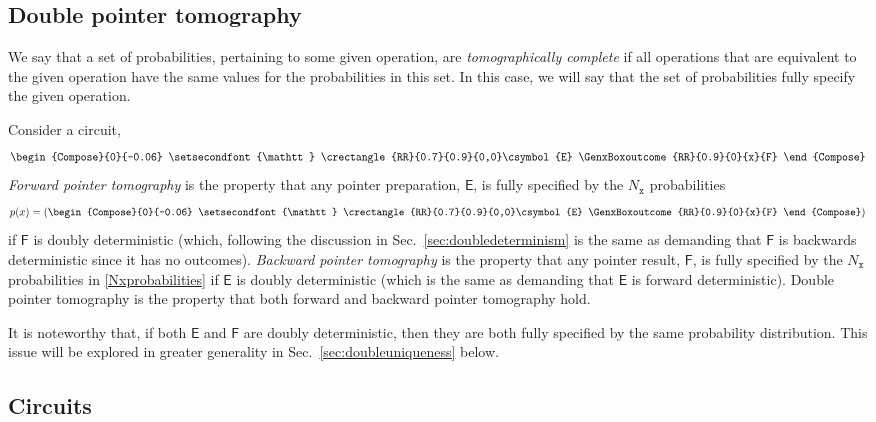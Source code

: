 \documentclass[10pt]{article}
\begin{document}
\subsection{Double pointer tomography}\label{sec:doublepointer tomography}

We say that a set of probabilities, pertaining to some given operation, are \emph{tomographically complete} if all operations that are equivalent to the given operation have the same values for the probabilities in this set.  In this case, we will say that the set of probabilities fully specify the given operation.

Consider a circuit,
\begin{equation}
\begin{Compose}{0}{-0.06} \setsecondfont{\mathtt}
\crectangle{RR}{0.7}{0.9}{0,0}\csymbol{E}
\GenxBoxoutcome{RR}{0.9}{0}{x}{F}
\end{Compose}
\end{equation}
\emph{Forward pointer tomography} is the property that any pointer preparation, $\mathsf{E}$, is fully specified by the $N_\mathtt{x}$ probabilities
\begin{equation}\label{Nxprobabilities}
p(x) = \left(
\begin{Compose}{0}{-0.06} \setsecondfont{\mathtt}
\crectangle{RR}{0.7}{0.9}{0,0}\csymbol{E}
\GenxBoxoutcome{RR}{0.9}{0}{x}{F}
\end{Compose}
\right)
\end{equation}
if $\mathsf F$ is doubly deterministic (which, following the discussion in  Sec.\ \ref{sec:doubledeterminism} is the same as demanding that $\mathsf F$ is backwards deterministic since it has no outcomes).  \emph{Backward pointer tomography} is the property that any pointer result, $\mathsf F$, is fully specified by the $N_\mathtt{x}$ probabilities in \eqref{Nxprobabilities} if $\mathsf E$ is doubly deterministic (which is the same as demanding that $\mathsf E$ is forward deterministic).  Double pointer tomography is the property that both forward and backward pointer tomography hold.

It is noteworthy that, if both $\mathsf E$ and $\mathsf F$ are doubly deterministic, then they are both fully specified by the same probability distribution.  This issue will be explored in greater generality in Sec.\ \ref{sec:doubleuniqueness} below.





\subsection{Circuits}\label{sec:circuitagain}
\end{document}
